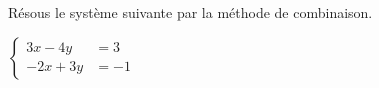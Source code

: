 %
%
    Résous le système suivante par la méthode de combinaison.

    $\left\{\begin{aligned}
            3x - 4y & = 3 \\
            -2x+3y  & =-1
        \end{aligned}\right.$
